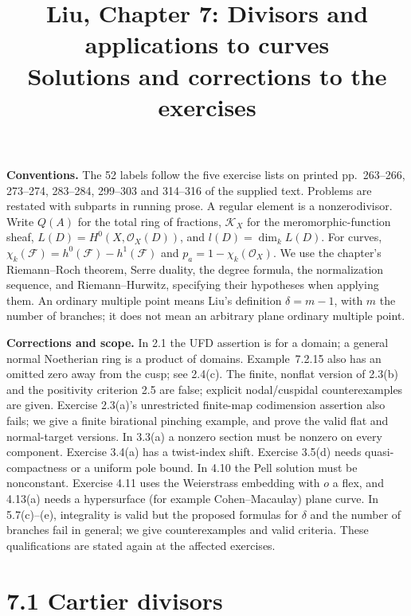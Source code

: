 \documentclass[11pt]{article}
\title{Liu, Chapter 7: Divisors and applications to curves\\[2pt]\large Solutions and corrections to the exercises}
\author{}
\date{}
\begin{document}
\maketitle
\textbf{Conventions.} The 52 labels follow the five exercise lists on printed pp.~263--266, 273--274, 283--284, 299--303 and 314--316 of the supplied text. Problems are restated with subparts in running prose. A regular element is a nonzerodivisor. Write $Q(A)$ for the total ring of fractions, $\mathcal K_X$ for the meromorphic-function sheaf, $L(D)=H^0(X,\mathcal O_X(D))$, and $l(D)=\dim_kL(D)$. For curves, $\chi_k(\mathcal F)=h^0(\mathcal F)-h^1(\mathcal F)$ and $p_a=1-\chi_k(\mathcal O_X)$. We use the chapter's Riemann--Roch theorem, Serre duality, the degree formula, the normalization sequence, and Riemann--Hurwitz, specifying their hypotheses when applying them. An ordinary multiple point means Liu's definition $\delta=m-1$, with $m$ the number of branches; it does not mean an arbitrary plane ordinary multiple point.

\textbf{Corrections and scope.} In 2.1 the UFD assertion is for a domain; a general normal Noetherian ring is a product of domains. Example~7.2.15 also has an omitted zero away from the cusp; see 2.4(c). The finite, nonflat version of 2.3(b) and the positivity criterion 2.5 are false; explicit nodal/cuspidal counterexamples are given. Exercise 2.3(a)'s unrestricted finite-map codimension assertion also fails; we give a finite birational pinching example, and prove the valid flat and normal-target versions. In 3.3(a) a nonzero section must be nonzero on every component. Exercise 3.4(a) has a twist-index shift. Exercise 3.5(d) needs quasi-compactness or a uniform pole bound. In 4.10 the Pell solution must be nonconstant. Exercise 4.11 uses the Weierstrass embedding with $o$ a flex, and 4.13(a) needs a hypersurface (for example Cohen--Macaulay) plane curve. In 5.7(c)--(e), integrality is valid but the proposed formulas for $\delta$ and the number of branches fail in general; we give counterexamples and valid criteria. These qualifications are stated again at the affected exercises.

\section*{7.1 Cartier divisors}
\end{document}
